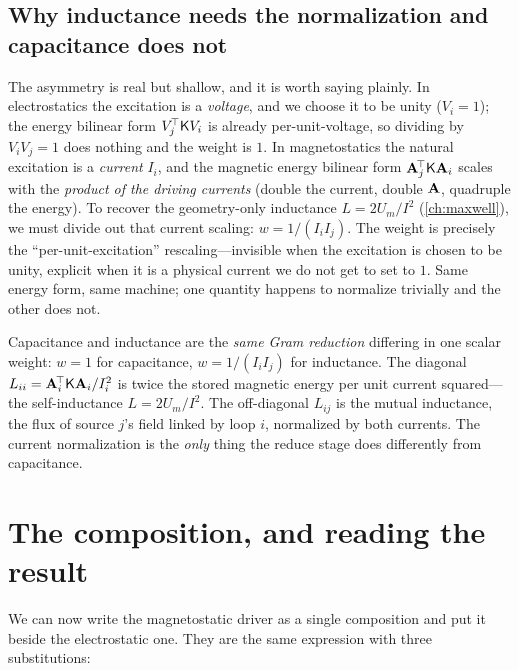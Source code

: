 \subsection{Why inductance needs the normalization and capacitance does not}

The asymmetry is real but shallow, and it is worth saying plainly. In
electrostatics the excitation is a \emph{voltage}, and we choose it to be unity
($V_i=1$); the energy bilinear form $V_j^{\!\top}\mathsf{K}V_i$ is already
per-unit-voltage, so dividing by $V_iV_j=1$ does nothing and the weight is $1$. In
magnetostatics the natural excitation is a \emph{current} $I_i$, and the magnetic
energy bilinear form $\mathbf{A}_j^{\!\top}\mathsf{K}\mathbf{A}_i$ scales with the \emph{product of
the driving currents} (double the current, double $\mathbf{A}$, quadruple the energy). To
recover the geometry-only inductance $L=2U_m/I^2$ (\cref{ch:maxwell}), we must
divide out that current scaling: $w=1/(I_iI_j)$. The weight is precisely the
``per-unit-excitation'' rescaling---invisible when the excitation is chosen to be
unity, explicit when it is a physical current we do not get to set to $1$. Same
energy form, same machine; one quantity happens to normalize trivially and the other
does not.

\begin{keyidea}
Capacitance and inductance are the \emph{same Gram reduction} differing in one
scalar weight: $w=1$ for capacitance, $w=1/(I_iI_j)$ for inductance. The diagonal
$L_{ii}=\mathbf{A}_i^{\!\top}\mathsf{K}\mathbf{A}_i/I_i^2$ is twice the stored magnetic energy per
unit current squared---the self-inductance $L=2U_m/I^2$. The off-diagonal $L_{ij}$
is the mutual inductance, the flux of source $j$'s field linked by loop $i$,
normalized by both currents. The current normalization is the \emph{only} thing the
reduce stage does differently from capacitance.
\end{keyidea}

\section{The composition, and reading the result}
\label{sec:compose}

We can now write the magnetostatic driver as a single composition and put it beside
the electrostatic one. They are the same expression with three substitutions:

